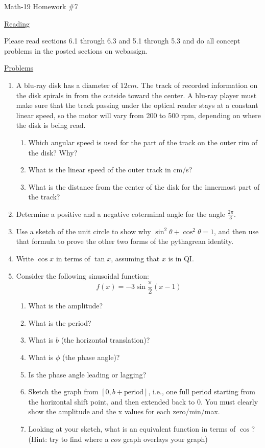 \documentclass[letterpaper,12pt,fleqn]{article}
\renewcommand{\o}{\theta}
\begin{document}
\begin{center}
\Large Math-19 Homework \#7
\end{center}

\vspace{0.5in}

\underline{Reading}

Please read sections 6.1 through 6.3 and 5.1 through 5.3 and do all concept
problems in the posted sections on web\-assign.

\underline{Problems}

\begin{enumerate}
\item A blu-ray disk has a diameter of $12cm$. The track of recorded
information on the disk spirals in from the outside toward the center. A blu-ray
player must make sure that the track passing under the optical reader stays at
a constant linear speed, so the motor will vary from 200 to 500 rpm, depending
on where the disk is being read.
\begin{enumerate}
\item Which angular speed is used for the  part of the track on the outer rim
of the disk? Why?
\item What is the linear speed of the outer track in cm/s?
\item What is the distance from the center of the disk for the innermost part
of the track?
\end{enumerate}

\item Determine a positive and a negative coterminal angle for the angle
$\frac{2\pi}{3}$.

\item Use a sketch of the unit circle to show why $\sin^2\o+\cos^2\o=1$, and
then use that formula to prove the other two forms of the pythagrean identity.

\item Write $\cos{x}$ in terms of $\tan{x}$, assuming that $x$ is in QI.

\item Consider the following sinusoidal function:
\[f(x)=-3\sin\frac{\pi}{2}(x-1)\]
\begin{enumerate}
\item What is the amplitude?
\item What is the period?
\item What is $b$ (the horizontal translation)?
\item What is $\phi$ (the phase angle)?
\item Is the phase angle leading or lagging?
\item Sketch the graph from $[0, b+\mbox{period}]$, i.e., one full period
starting from the horizontal shift point, and then extended back to 0. You must
clearly show the amplitude and the x values for each zero/min/max.
\item Looking at your sketch, what is an equivalent function in terms of
$\cos$? (Hint: try to find where a $cos$ graph overlays your graph)
\end{enumerate}
\end{enumerate}
\end{document}
